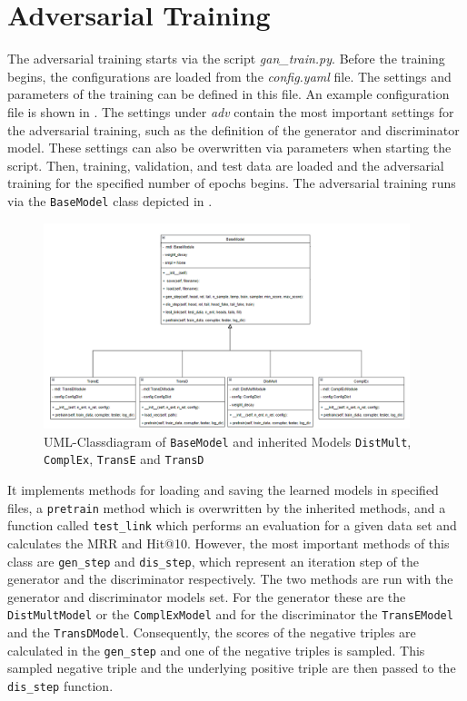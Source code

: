 \section{Adversarial Training}
\label{sec:adv_training}
%
The adversarial training starts via the script \textit{gan\_train.py}.
Before the training begins, the configurations are loaded from the \textit{config.yaml} file.
The settings and parameters of the training can be defined in this file.
An example configuration file is shown in .
The settings under \textit{adv} contain the most important settings for the adversarial training, such as the definition of the generator and discriminator model.
These settings can also be overwritten via parameters when starting the script.
Then, training, validation, and test data are loaded and the adversarial training for the specified number of epochs begins.
\newpage
The adversarial training runs via the \texttt{BaseModel} class depicted in .
\begin{figure}[t]
  \centering
    \includegraphics[width=0.95\textwidth]{figures/BaseModel.png}
  \caption{\ac{UML}-Classdiagram of \texttt{BaseModel} and inherited Models  \texttt{DistMult},  \texttt{ComplEx},  \texttt{TransE} and  \texttt{TransD}}
  \label{fig:basemodel_classdiagram}
\end{figure}
It implements methods for loading and saving the learned models in specified files, a \texttt{pretrain} method which is overwritten by the inherited methods, and a function called \texttt{test\_link} which performs an evaluation for a given data set and calculates the MRR and Hit@10.
However, the most important methods of this class are \texttt{gen\_step} and \texttt{dis\_step}, which represent an iteration step of the generator and the discriminator respectively.
The two methods are run with the generator and discriminator models set.
For the generator these are the \texttt{DistMultModel} or the \texttt{ComplExModel} and for the discriminator the \texttt{TransEModel} and the \texttt{TransDModel}.
Consequently, the scores of the negative triples are calculated in the \texttt{gen\_step} and one of the negative triples is sampled.
This sampled negative triple and the underlying positive triple are then passed to the \texttt{dis\_step} function.

